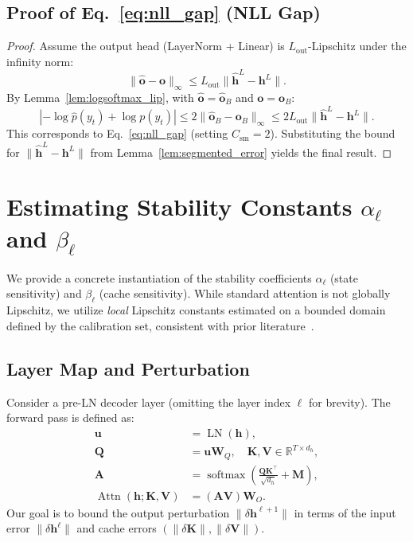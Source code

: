 \documentclass{article}
\theoremstyle{plain}
\theoremstyle{definition}
\theoremstyle{remark}
\begin{document}
\subsection{Proof of Eq.~\eqref{eq:nll_gap} (NLL Gap)}

\begin{proof}
Assume the output head (LayerNorm + Linear) is $L_{\mathrm{out}}$-Lipschitz under the infinity norm:
\[
\| \hat{\mathbf{o}} - \mathbf{o} \|_\infty \le L_{\mathrm{out}} \| \hat{\mathbf{h}}^L - \mathbf{h}^L \|.
\]
By Lemma~\ref{lem:logsoftmax_lip}, with $\hat{\mathbf{o}} = \hat{\mathbf{o}}_B$ and $\mathbf{o} = \mathbf{o}_B$:
\[
| -\log \hat{p}(y_t) + \log p(y_t) |
\le 2 \| \hat{\mathbf{o}}_B - \mathbf{o}_B \|_\infty
\le 2 L_{\mathrm{out}} \| \hat{\mathbf{h}}^L - \mathbf{h}^L \|.
\]
This corresponds to Eq.~\eqref{eq:nll_gap} (setting $C_{\mathrm{sm}} = 2$).
Substituting the bound for $\| \hat{\mathbf{h}}^L - \mathbf{h}^L \|$ from Lemma~\ref{lem:segmented_error} yields the final result.
\end{proof}









\section{Estimating Stability Constants $\alpha_\ell$ and $\beta_\ell$}
\label{sec:inst_ab}

We provide a concrete instantiation of the stability coefficients $\alpha_\ell$ (state sensitivity) and $\beta_\ell$ (cache sensitivity).
While standard attention is not globally Lipschitz, we utilize \emph{local} Lipschitz constants estimated on a bounded domain defined by the calibration set, consistent with prior literature~\citep{castin2023smooth,yudin2025pay}.

\subsection{Layer Map and Perturbation}
\label{sec:layer_map}

Consider a pre-LN decoder layer (omitting the layer index $\ell$ for brevity). The forward pass is defined as:
\begin{align}
\mathbf{u} &= \operatorname{LN}(\mathbf{h}), \\
\mathbf{Q} &= \mathbf{u} \mathbf{W}_Q, \quad \mathbf{K}, \mathbf{V} \in \mathbb{R}^{T \times d_h}, \\
\mathbf{A} &= \operatorname{softmax}\left( \frac{\mathbf{Q} \mathbf{K}^\top}{\sqrt{d_h}} + \mathbf{M} \right), \\
\operatorname{Attn}(\mathbf{h}; \mathbf{K}, \mathbf{V}) &= (\mathbf{A} \mathbf{V}) \mathbf{W}_O.
\end{align}
Our goal is to bound the output perturbation $\| \delta \mathbf{h}^{\ell+1} \|$ in terms of the input error $\| \delta \mathbf{h}^\ell \|$ and cache errors $(\| \delta \mathbf{K} \|, \| \delta \mathbf{V} \|)$.
\end{document}
